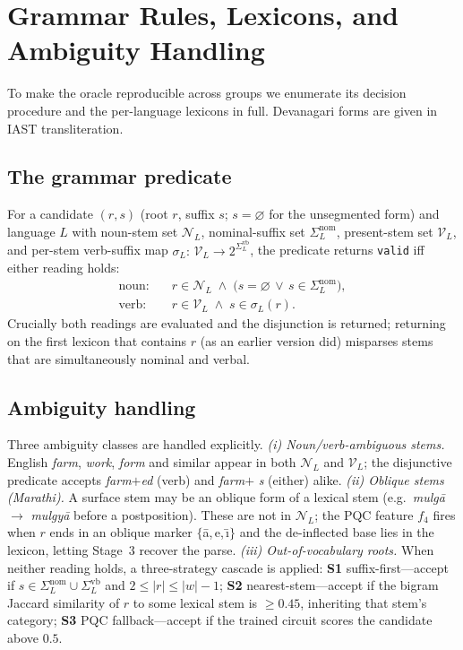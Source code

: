 \documentclass[journal]{IEEEtran}
\begin{document}
\appendices
\section{Grammar Rules, Lexicons, and Ambiguity Handling}
\label{app:grammar}
To make the oracle reproducible across groups we enumerate its decision procedure
and the per-language lexicons in full. Devanagari forms are given in IAST
transliteration.

\subsection{The grammar predicate}
For a candidate $(r,s)$ (root $r$, suffix $s$; $s=\varnothing$ for the
unsegmented form) and language $L$ with noun-stem set $\mathcal{N}_L$, nominal-suffix
set $\Sigma^{\mathrm{nom}}_L$, present-stem set $\mathcal{V}_L$, and per-stem verb-suffix
map $\sigma_L{:}\,\mathcal{V}_L\!\to\!2^{\Sigma^{\mathrm{vb}}_L}$, the predicate returns
\texttt{valid} iff either reading holds:
\begin{align*}
\text{noun:}\quad & r\in\mathcal{N}_L \;\wedge\; \big(s=\varnothing \,\vee\, s\in\Sigma^{\mathrm{nom}}_L\big),\\
\text{verb:}\quad & r\in\mathcal{V}_L \;\wedge\; s\in\sigma_L(r).
\end{align*}
Crucially both readings are evaluated and the disjunction is returned; returning
on the first lexicon that contains $r$ (as an earlier version did) misparses
stems that are simultaneously nominal and verbal.

\subsection{Ambiguity handling}
Three ambiguity classes are handled explicitly.
\emph{(i) Noun/verb-ambiguous stems.} English \emph{farm}, \emph{work},
\emph{form} and similar appear in both $\mathcal{N}_L$ and $\mathcal{V}_L$; the
disjunctive predicate accepts \emph{farm}$+$\emph{ed} (verb) and \emph{farm}$+$%
\emph{s} (either) alike.
\emph{(ii) Oblique stems (Marathi).} A surface stem may be an oblique form of a
lexical stem (e.g.\ \emph{mulg\={a}} $\to$ \emph{mulgy\={a}} before a
postposition). These are not in $\mathcal{N}_L$; the PQC feature $f_4$ fires when
$r$ ends in an oblique marker $\{$\={a},\,e,\,\={\i}$\}$ and the de-inflected base
lies in the lexicon, letting Stage~3 recover the parse.
\emph{(iii) Out-of-vocabulary roots.} When neither reading holds, a three-strategy
cascade is applied: \textbf{S1} suffix-first---accept if $s\in\Sigma^{\mathrm{nom}}_L\cup\Sigma^{\mathrm{vb}}_L$
and $2\le|r|\le|w|{-}1$; \textbf{S2} nearest-stem---accept if the bigram Jaccard
similarity of $r$ to some lexical stem is $\ge 0.45$, inheriting that stem's
category; \textbf{S3} PQC fallback---accept if the trained circuit scores the
candidate above $0.5$.
\end{document}

